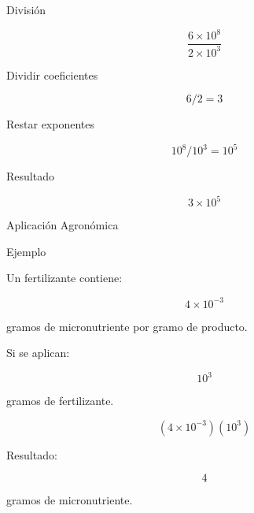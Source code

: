 \documentclass[aspectratio=169,10pt,handout]{beamer}
\newcommand{\pp}{\pause}
\begin{document}
	\begin{frame}{División}
		
		\[
		\frac{6\times10^8}{2\times10^3}
		\]
		
		\pp
		
		Dividir coeficientes
		
		\[
		6/2 = 3
		\]
		
		\pp
		
		Restar exponentes
		
		\[
		10^8 / 10^3 = 10^5
		\]
		
		\pp
		
		Resultado
		
		\[
		3\times10^5
		\]
		
	\end{frame}
	
	\begin{frame}{Aplicación Agronómica}
		
		\begin{block}{Ejemplo}
			
			Un fertilizante contiene:
			
			\[
			4\times10^{-3}
			\]
			
			gramos de micronutriente por gramo de producto.
			
		\end{block}
		
		\pp
		
		Si se aplican:
		
		\[
		10^3
		\]
		
		gramos de fertilizante.
		
		\pp
		
		\[
		(4\times10^{-3})(10^3)
		\]
		
		\pp
		
		Resultado:
		
		\[
		4
		\]
		
		gramos de micronutriente.
		
	\end{frame}
	
\end{document}

